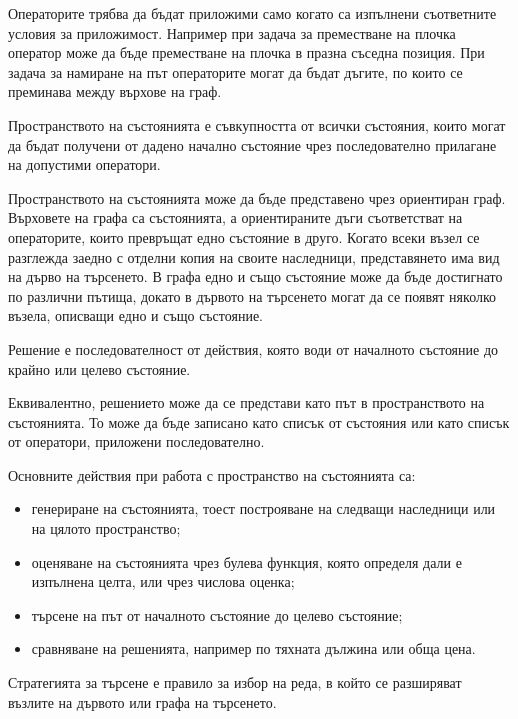 Операторите трябва да бъдат приложими само когато са изпълнени съответните условия за приложимост. Например при задача за преместване на плочка оператор може да бъде преместване на плочка в празна съседна позиция. При задача за намиране на път операторите могат да бъдат дъгите, по които се преминава между върхове на граф.

\begin{defn}
Пространството на състоянията е съвкупността от всички състояния, които могат да бъдат получени от дадено начално състояние чрез последователно прилагане на допустими оператори.
\end{defn}

Пространството на състоянията може да бъде представено чрез ориентиран граф. Върховете на графа са състоянията, а ориентираните дъги съответстват на операторите, които превръщат едно състояние в друго. Когато всеки възел се разглежда заедно с отделни копия на своите наследници, представянето има вид на дърво на търсенето. В графа едно и също състояние може да бъде достигнато по различни пътища, докато в дървото на търсенето могат да се появят няколко възела, описващи едно и също състояние.

\begin{defn}[Решение]
Решение е последователност от действия, която води от началното състояние до крайно или целево състояние.
\end{defn}

Еквивалентно, решението може да се представи като път в пространството на състоянията. То може да бъде записано като списък от състояния или като списък от оператори, приложени последователно.

Основните действия при работа с пространство на състоянията са:

\begin{itemize}
\item генериране на състоянията, тоест построяване на следващи наследници или на цялото пространство;
\item оценяване на състоянията чрез булева функция, която определя дали е изпълнена целта, или чрез числова оценка;
\item търсене на път от началното състояние до целево състояние;
\item сравняване на решенията, например по тяхната дължина или обща цена.
\end{itemize}

\begin{defn}
Стратегията за търсене е правило за избор на реда, в който се разширяват възлите на дървото или графа на търсенето.
\end{defn}

